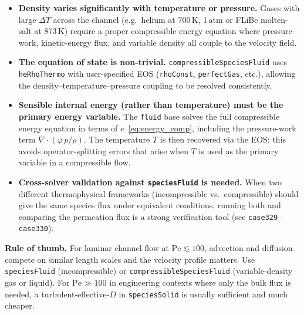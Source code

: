 \documentclass[11pt,a4paper]{article}
\newcommand{\caseref}[1]{\texttt{\color{casegreen}#1}}
\begin{document}
\begin{itemize}[itemsep=4pt]

  \item \textbf{Density varies significantly with temperature or pressure.}
        Gases with large $\Delta T$ across the channel (e.g.\ helium at
        700\,K, 1\,atm or FLiBe molten-salt at 873\,K) require a proper
        compressible energy equation where pressure-work, kinetic-energy
        flux, and variable density all couple to the velocity field.

  \item \textbf{The equation of state is non-trivial.}
        \texttt{compressibleSpeciesFluid} uses \texttt{heRhoThermo} with
        user-specified EOS (\texttt{rhoConst}, \texttt{perfectGas}, etc.),
        allowing the density--temperature--pressure coupling to be resolved
        consistently.

  \item \textbf{Sensible internal energy (rather than temperature) must be
        the primary energy variable.}
        The \texttt{fluid} base solves the full compressible energy equation
        in terms of $e$~\eqref{eq:energy_comp}, including the
        pressure-work term $\nabla\cdot(\varphi\,p/\rho)$.  The temperature
        $T$ is then recovered via the EOS; this avoids operator-splitting
        errors that arise when $T$ is used as the primary variable in a
        compressible flow.

  \item \textbf{Cross-solver validation against \texttt{speciesFluid} is
        needed.}
        When two different thermophysical frameworks (incompressible vs.\
        compressible) should give the same species flux under equivalent
        conditions, running both and comparing the permeation flux is a
        strong verification tool (see \caseref{case329}--\caseref{case330}).

\end{itemize}

\begin{tcolorbox}[notebox]
  \textbf{Rule of thumb.}  For laminar channel flow at $\mathrm{Pe} \lesssim 100$,
  advection and diffusion compete on similar length scales and the velocity
  profile matters.  Use \texttt{speciesFluid} (incompressible) or
  \texttt{compressibleSpeciesFluid} (variable-density gas or liquid).  For
  $\mathrm{Pe} \gg 100$ in engineering contexts where only the bulk flux is
  needed, a turbulent-effective-$D$ in \texttt{speciesSolid} is usually
  sufficient and much cheaper.
\end{tcolorbox}
\end{document}

